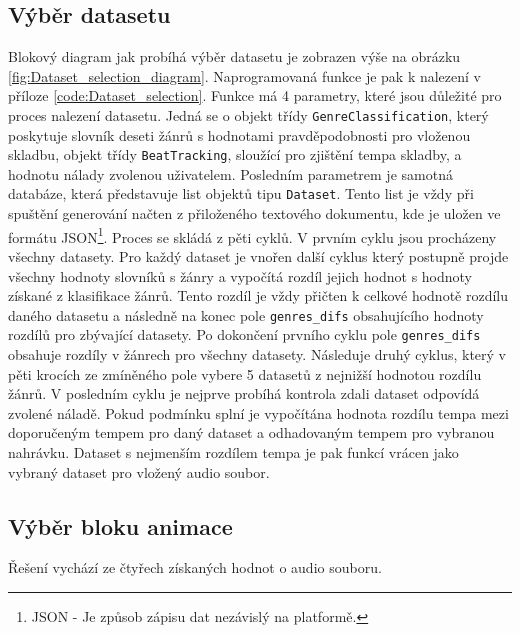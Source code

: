 \subsection{Výběr datasetu} \label{sec:Vyber_datasetu}

Blokový diagram jak probíhá výběr datasetu je zobrazen výše na obrázku \ref{fig:Dataset_selection_diagram}. Naprogramovaná funkce je pak k nalezení v příloze \ref{code:Dataset_selection}. Funkce má 4 parametry, které jsou důležité pro proces nalezení datasetu. Jedná se o objekt třídy \texttt{GenreClassification}, který poskytuje slovník deseti žánrů s hodnotami pravděpodobnosti pro vloženou skladbu, objekt třídy \texttt{BeatTracking}, sloužící pro zjištění tempa skladby, a hodnotu nálady zvolenou uživatelem. Posledním parametrem je samotná databáze, která představuje list objektů tipu \texttt{Dataset}. Tento list je vždy při spuštění generování načten z přiloženého textového dokumentu, kde je uložen ve formátu \acs{JSON}\footnote{JSON - Je způsob zápisu dat nezávislý na platformě.\cite{JSON}}. Proces se skládá z pěti cyklů. V prvním cyklu jsou procházeny všechny datasety. Pro každý dataset je vnořen další cyklus který postupně projde všechny hodnoty slovníků s žánry a vypočítá rozdíl jejich hodnot s hodnoty získané z klasifikace žánrů. Tento rozdíl je vždy přičten k celkové hodnotě rozdílu daného datasetu a následně na konec pole \texttt{genres\_difs} obsahujícího hodnoty rozdílů pro zbývající datasety. Po dokončení prvního cyklu pole \texttt{genres\_difs} obsahuje rozdíly v žánrech pro všechny datasety. Následuje druhý cyklus, který v pěti krocích ze zmíněného pole vybere 5 datasetů z nejnižší hodnotou rozdílu žánrů. V posledním cyklu je nejprve probíhá kontrola zdali dataset odpovídá zvolené náladě. Pokud podmínku splní je vypočítána hodnota rozdílu tempa mezi doporučeným tempem pro daný dataset a odhadovaným tempem pro vybranou nahrávku. Dataset s nejmenším rozdílem tempa je pak funkcí vrácen jako vybraný dataset pro vložený audio soubor. 

\subsection{Výběr bloku animace} \label{sec:Vyber_bloku_animace}

Řešení vychází ze čtyřech získaných hodnot o audio souboru.

